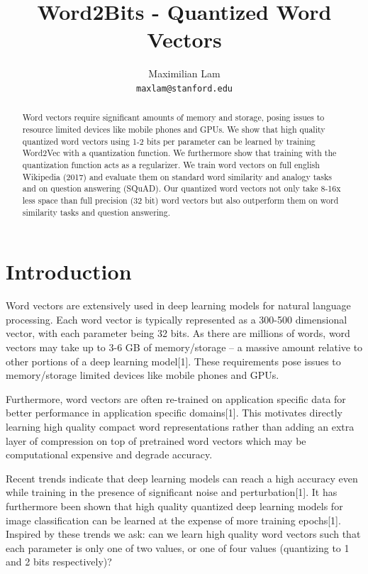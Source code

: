 \documentclass{article} %
\title{Word2Bits - Quantized Word Vectors}
\author{
Maximilian Lam\\
\texttt{maxlam@stanford.edu} \\
}
\begin{document}
\maketitle

\begin{abstract}
Word vectors require significant amounts of memory and storage, posing
issues to resource limited devices like mobile phones and GPUs. We
show that high quality quantized word vectors using 1-2 bits per
parameter can be learned by training Word2Vec with a quantization
function. We furthermore show that training with the quantization
function acts as a regularizer. We train word vectors on full english
Wikipedia (2017) and evaluate them on standard word similarity and
analogy tasks and on question answering (SQuAD). Our quantized word
vectors not only take 8-16x less space than full precision (32 bit)
word vectors but also outperform them on word similarity tasks and
question answering.
\end{abstract}

\section{Introduction}
Word vectors are extensively used in deep learning models for natural
language processing. Each word vector is typically represented as a
300-500 dimensional vector, with each parameter being 32 bits. As
there are millions of words, word vectors may take up to 3-6 GB of
memory/storage -- a massive amount relative to other portions of a
deep learning model[1]. These requirements pose issues to
memory/storage limited devices like mobile phones and GPUs.

Furthermore, word vectors are often re-trained on application specific
data for better performance in application specific domains[1]. This
motivates directly learning high quality compact word representations
rather than adding an extra layer of compression on top of pretrained
word vectors which may be computational expensive and degrade
accuracy.

Recent trends indicate that deep learning models can reach a high
accuracy even while training in the presence of significant noise and
perturbation[1]. It has furthermore been shown that high quality
quantized deep learning models for image classification can be learned
at the expense of more training epochs[1]. Inspired by these trends we
ask: can we learn high quality word vectors such that each parameter
is only one of two values, or one of four values (quantizing to 1 and
2 bits respectively)?
\end{document}
